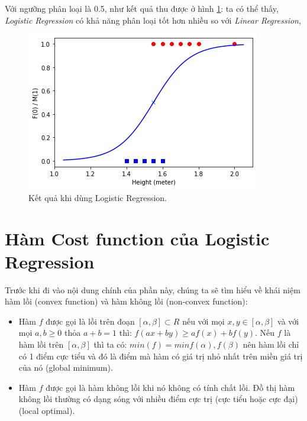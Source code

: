 Với ngưỡng phân loại là 0.5, như  kết quả thu được ở hình \ref{fig:lg_result}: ta có thể thấy, \textit{Logistic Regression} có khả năng phân loại tốt hơn nhiều so với \textit{Linear Regression},

\begin{figure}[!ht]
    \centering
    \includegraphics[scale=0.8]{chapter02/figure/LG_result.png}
    \caption{Kết quả khi dùng Logistic Regression.}
    \label{fig:lg_result}
\end{figure}

\section{Hàm Cost function của Logistic Regression}
Trước khi đi vào nội dung chính của phần này, chúng ta sẽ tìm hiểu về khái niệm hàm lồi (convex function) và hàm không lồi (non-convex function):

\begin{itemize}
    \item Hàm $f$ được gọi là lồi trên đoạn $[\alpha, \beta] \subset R$ nếu với mọi $x,y \in [\alpha, \beta]$ và với mọi $a, b \geq 0$ thỏa $a + b = 1$ thì: $f(ax + by) \geq af(x) + bf(y)$. Nếu $f$ là hàm lồi trên $[\alpha, \beta]$ thì ta có: $min(f)=min{f(\alpha), f(\beta)}$ nên hàm lồi chỉ có 1 điểm cực tiểu và đó là điểm mà hàm có giá trị nhỏ nhất trên miền giá trị của nó (global minimum).
    \item Hàm $f$ được gọi là hàm không lồi khi nó không có tính chất lồi. Đồ thị hàm không lồi thường có dạng sóng với nhiều điểm cực trị (cực tiểu hoặc cực đại) (local optimal). 
\end{itemize}

